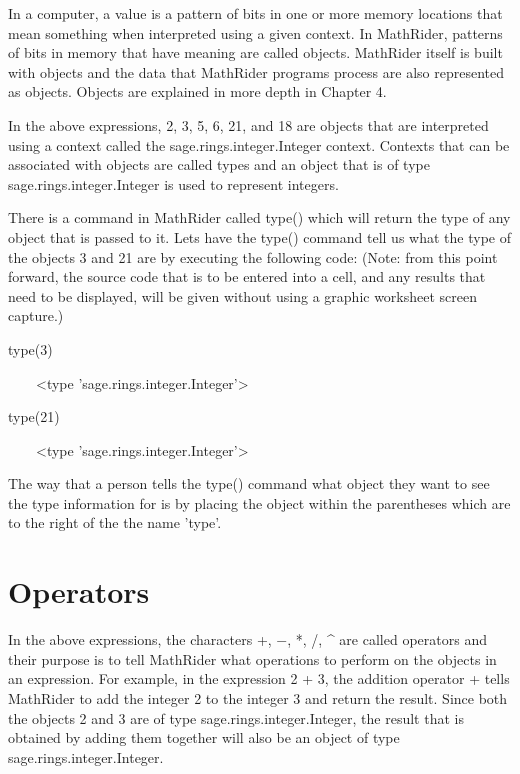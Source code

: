 \documentclass[12pt,oneside]{book}
\begin{document}
In a computer, a value is a pattern of bits in one or more memory locations that mean something when interpreted using a given context. In MathRider, patterns of bits in memory that have meaning are called objects. MathRider itself is built with objects and the data that MathRider programs process are also represented as objects. Objects are explained in more depth in Chapter 4. 

In the above expressions, 2, 3, 5, 6, 21, and 18 are objects that are interpreted using a context called the sage.rings.integer.Integer context. Contexts that can be associated with objects are called types and an object that is of type sage.rings.integer.Integer is used to represent integers. 

There is a command in MathRider called type() which will return the type of any object that is passed to it. Lets have the type() command tell us what the type of the objects 3 and 21 are by executing the following code: (Note: from this point forward, the source code that is to be entered into a cell, and any results that need to be displayed, will be given without using a graphic worksheet screen capture.) 

type(3)

{\textbar}

\ \ \ \ {\textless}type 'sage.rings.integer.Integer'{\textgreater}


type(21)

{\textbar}

\ \ \ \ {\textless}type 'sage.rings.integer.Integer'{\textgreater}


The way that a person tells the type() command what object they want to see the type information for is by placing the object within the parentheses which are to the right of the the name 'type'.

\section[Operators]{Operators}

In the above expressions, the characters +, $-$, *, /, \^{} are called operators and their purpose is to tell MathRider what operations to perform on the objects in an expression. For example, in the expression 2 + 3, the addition operator + tells MathRider to add the integer 2 to the integer 3 and return the result. Since both the objects 2 and 3 are of type sage.rings.integer.Integer, the result that is obtained by adding them together will also be an object of type sage.rings.integer.Integer. 
\end{document}
